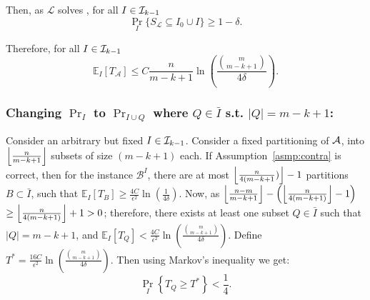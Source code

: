 Then, as $\mathcal{L}$ solves \QFK, for all $I \in \mathcal{I}_{k-1}$
\begin{equation}
\label{eq:contra}
 \Pr_I\{S_\mathcal{L} \subseteq I_0 \cup I\} \geq 1 - \delta.
\end{equation}

Therefore, for all $I \in \mathcal{I}_{k-1}$
\begin{equation}
 \mathbb{E}_{I}[T_\mathcal{A}] \leq C \frac{n}{m-k+1} \ln\left(\frac{\binom{m}{m-k+1}}{4\delta}\right).
\end{equation}


\subsubsection{Changing $\Pr_{I}$ to $\Pr_{I \cup Q}$ where $Q \in \bar{I}$ s.t. $|Q| = m-k+1$: }
Consider an arbitrary but fixed $I \in \mathcal{I}_{k-1}$. Consider a fixed partitioning of $\mathcal{A}$, into $\Big\lfloor\frac{n}{m-k+1}\Big\rfloor$
subsets of size $(m-k+1)$ each.
If Assumption~\eqref{asmp:contra} is correct, then 
for the instance $\mathcal{B}^{I}$,
there are at most $\Big\lfloor\frac{n}{4(m-k+1})\Big\rfloor-1$ partitions $B \subset\bar{I}$, such that $\mathbb{E}_{I}\left[T_B\right] \geq \frac{4C}{\epsilon^2}\ln\left(\frac{1}{4\delta}\right)$.
Now, as $\Big\lfloor\frac{n-m}{m-k+1}\Big\rfloor - \left(\Big\lfloor\frac{n}{4(m-k+1)}\Big\rfloor - 1\right)$ 
$\geq \Big\lfloor\frac{n}{4(m-k+1)}\Big\rfloor + 1 > 0$;
therefore, there exists at least one subset $Q \in \bar{I}$ such that
$|Q| = m-k+1$, and $\mathbb{E}_{I}\left[T_Q\right] < \frac{4C}{\epsilon^2}\ln\left(\frac{\binom{m}{m-k+1}}{4\delta}\right)$.
Define $T^* = \frac{16C}{\epsilon^2}\ln\left(\frac{\binom{m}{m-k+1}}{4\delta}\right)$. Then
using Markov's inequality we get:
\begin{equation}\label{eq:lbusage}
 \Pr_{I}\left\{T_Q \geq T^*\right\} < \frac{1}{4}.
\end{equation}

